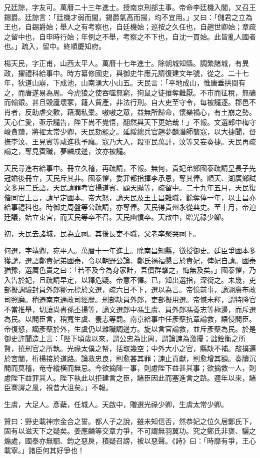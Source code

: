 \begin{pinyinscope}
兄廷諒，字友可。萬曆二十三年進士。授南京刑部主事。帝命李廷機入閣，又召王錫爵。廷諒言：「廷機才弱而闇，錫爵氣高而揚，均不宜用。」又曰：「儲君之立為王也，自錫爵始；舉人之有考察也，自廷機始；巡按之久任也，自趙世卿始；章疏之留中也，自申時行始；年例之不舉，考察之不下也，自沈一貫始。此皆亂人國者也。」疏入，留中。終順慶知府。

楊天民，字正甫，山西太平人。萬曆十七年進士。除朝城知縣。調繁諸城，有異政，擢禮科給事中。時方纂修國史，與御史牛應元請復建文年號，從之。二十七年，狄道山崩，下成池，山南湧大小山五。天民言：「平地成山，惟唐垂拱間有之，而唐遂易為周。今虎狼之使吞噬無窮，狗鼠之徒攘奪難厭。不市而征稅，無礦而輸銀。甚且毀廬壞冢，籍人貲產，非法行刑。自大吏至守令，每被譴逐。郡邑不肖者，反助虐交歡，藉潤私橐。嗷嗷之眾，益無所歸命，懷樂禍心，有土崩之勢。天心仁愛，亟示譴告，陛下尚不覺悟，翻然與天下更始哉！」不報。文選郎中梅守峻貪黷，將擢太常少卿，天民劾罷之。延綏總兵官趙夢麟潛師襲寇，以大捷聞，督撫李汶、王見賓等咸進秩予廕。寇乃大入，殺軍民萬計，汶等又妄奏捷。天民再疏論之，奪見賓職，夢麟戍邊，汶亦被譴。

天民尋進右給事中。冊立久稽，再疏請，不報。無何，貴妃弟鄭國泰疏請皇長子先冠婚後冊立，天民斥其非。國泰懼，委罪都指揮李承恩，奪其俸。順天、湖廣鄉試文多用二氏語，天民請罪考官楊道賓、顧天颭等，疏留中。二十九年五月，天民復偕同官上言，請早定國本。帝大怒，謫天民及王士昌雜職，餘奪俸一年，以士昌亦給事禮科也。時御史周盤等公疏請，亦奪俸。天民得貴州永從典史。至十月，帝迫廷議，始立東宮，而天民等卒不召。天民幽憤卒。天啟中，贈光祿少卿。

初，天民去諸城，民為立祠。其後長吏不職，父老率聚哭祠下。

何選，字靖卿，宛平人。萬曆十一年進士。除南昌知縣，徵授御史。廷臣爭國本多獲譴，選語鄭貴妃弟國泰，令以朝野公論、鄭氏禍福懇言於貴妃，俾妃自請。國泰猶豫，選厲色責之曰：「若不及今為身家計，吾儕群擊之，悔無及矣。」國泰懼，乃入告於妃，且疏請早定，以釋危疑。帝意不懌。已，知出選指，深銜之。未幾，吏部擬調驗封員外郎鄒元標於文選，疏六日不下，選以為言。帝憶前事，謫湖廣布政司照磨。稍遷南京通政司經歷。刑部缺員外郎，吏部擬用選。帝憾未釋，謂特降官不當推舉，切讓尚書孫丕揚等，謫文選郎中馮生虞、員外郎馮養志等極邊，而斥選為民。以閣臣言，稍寬生虞、養志等罰。南京給事中任彥蘗抗章論救，語侵閣臣。帝復怒，謫彥蘗於外，生虞仍以雜職調邊方。旋以言官論救，並斥彥蘗為民。於是御史許聞造上言：「陛下頃歲以來，謂公忠為比周，謂論諫為激擾；詘銓衡之所賢，撓刑官之所執。光祿太僕之帑，括取幾空；中外大小之官，縣缺不補。敲撲遍於宮闈，桁楊接於道路。論救忠良，則愈甚其罪；諫止貢獻，則愈增其額。奏牘沉閣而莫稽，奄寺縱橫而無忌。今欲摘陳一事，則慮陛下益甚其事；欲摘救一人，則慮陛下益罪其人。陛下執此以拒建言之臣，諸臣因此而塞進言之路。邇年以來，諸臣謇諤之風，視昔大沮矣。」不報。

生虞，大足人。彥蘗，任城人。天啟中，贈選光祿少卿，生虞太常少卿。

贊曰：野史載神宗金合之誓。都人子之說，雖未知信否，然恭妃之位久居鄭氏下，固有以滋天下之疑矣。姜應麟等交章力爭，不可謂無羽翼功。究之鄭氏非褒、驪之煽處，國泰亦無駟、鈞之惡戾，積疑召謗，被以惡聲。《詩》曰：「時靡有爭，王心載寧。」諸臣何其好爭也！


\end{pinyinscope}